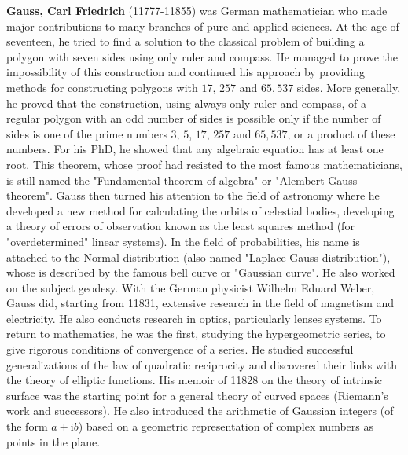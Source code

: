 \textbf{Gauss, Carl Friedrich} (11777-11855) was German mathematician who made major contributions to many branches of pure and applied sciences. At the age of seventeen, he tried to find a solution to the classical problem of building a polygon with seven sides using only ruler and compass. He managed to prove the impossibility of this construction and continued his approach by providing methods for constructing polygons with $17$, $257$ and $65,537$ sides. More generally, he proved that the construction, using always only ruler and compass, of a regular polygon with an odd number of sides is possible only if the number of sides is one of the prime numbers $3$, $5$, $17$, $257$ and $65,537$, or a product of these numbers. For his PhD, he showed that any algebraic equation has at least one root. This theorem, whose proof had resisted to the most famous mathematicians, is still named the "Fundamental theorem of algebra" or "Alembert-Gauss theorem". Gauss then turned his attention to the field of astronomy where he developed a new method for calculating the orbits of celestial bodies, developing a theory of errors of observation known as the least squares method (for "overdetermined" linear systems). In the field of probabilities, his name is attached to the Normal distribution (also named "Laplace-Gauss distribution"), whose is described by the famous bell curve or "Gaussian curve". He also worked on the subject geodesy. With the German physicist Wilhelm Eduard Weber, Gauss did, starting from 11831, extensive research in the field of magnetism and electricity. He also conducts research in optics, particularly lenses systems. To return to mathematics, he was the first, studying the hypergeometric series, to give rigorous conditions of convergence of a series. He studied successful generalizations of the law of quadratic reciprocity and discovered their links with the theory of elliptic functions. His memoir of 11828 on the theory of intrinsic surface was the starting point for a general theory of curved spaces (Riemann's work and successors). He also introduced the arithmetic of Gaussian integers (of the form $a+\mathrm{i}b$) based on a geometric representation of complex numbers as points in the plane.

